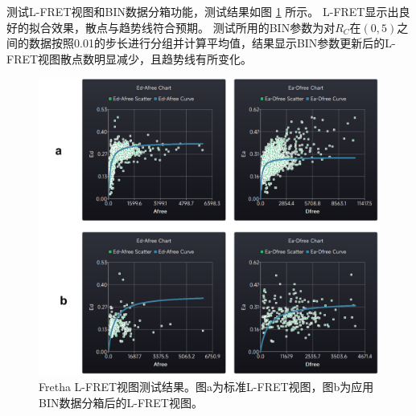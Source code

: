 测试L-FRET视图和BIN数据分箱功能，测试结果如图 \ref{fig:L-FRET视图测试} 所示。
L-FRET显示出良好的拟合效果，散点与趋势线符合预期。
测试所用的BIN参数为对$R_C$在$(0,5)$之间的数据按照0.01的步长进行分组并计算平均值，结果显示BIN参数更新后的L-FRET视图散点数明显减少，且趋势线有所变化。
\begin{figure}
  \centering
  \includegraphics[width=0.9\linewidth]{../figures/4/4_L-FRET视图测试.png}
  \caption[Fretha L-FRET视图测试结果]{Fretha L-FRET视图测试结果。图a为标准L-FRET视图，图b为应用BIN数据分箱后的L-FRET视图。}
  \label{fig:L-FRET视图测试}
\end{figure}

